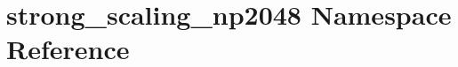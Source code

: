 \hypertarget{namespacestrong__scaling__np2048}{}\section{strong\+\_\+scaling\+\_\+np2048 Namespace Reference}
\label{namespacestrong__scaling__np2048}
